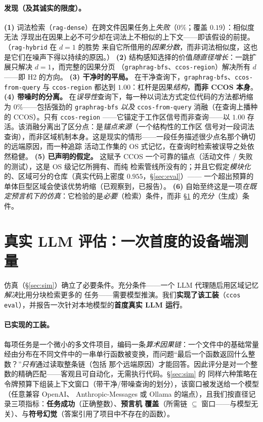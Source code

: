 \documentclass[11pt]{ctexart}
\newcommand{\code}[1]{\texttt{#1}}
\begin{document}
\paragraph{发现（及其诚实的限度）。}
\textbf{(1)} 词法检索（\code{rag-dense}）在跨文件因果任务上\emph{失败}（$0\%$；覆盖 $0.19$）：相似度无法
浮现出在因果上必不可少却在词法上不相似的上下文——即该假设的前提。（\code{rag-hybrid} 在 $d{=}1$ 的胜势
来自它所借用的\emph{因果分数}，而非词法相似度，这也是它们在噪声下得以持续的原因。）
\textbf{(2)} 结构感知选择的价值\emph{随直径增长}：一跳扩展只解决 $d{=}1$，而完整的因果分页
（\code{graphrag-bfs}、\code{ccos-region}）解决所有 $d$——即 H2 的方向。
\textbf{(3) 干净时的平局。} 在干净查询下，\code{graphrag-bfs}、\code{ccos-from-query} 与
\code{ccos-region} 都达到 $1.00$：杠杆是因果\emph{结构}，\textbf{而非 CCOS 本身}。
\textbf{(4) 带噪时的分离。} 在\emph{误导性}查询下，每一种以词法方式定位代码的方法都坍缩为 $0\%$——包括强劲的
\code{graphrag-bfs} \emph{以及} \code{ccos-from-query} 消融（在查询上播种的 CCOS）。只有 \code{ccos-region}
——它锚定于工作区信号而非查询——以 $1.00$ 存活。该消融分离出了区分点：是\emph{锚点来源}（一个结构性的工作区
信号对一段词法查询），而非区域机制本身。这是现实的情形——一段任务描述很少点名那个确切的远端原因，而一种追踪
活动工作集的 OS 式记忆，在查询时检索被误导之处依然稳健。
\textbf{(5) 已声明的假定。} 这赋予 CCOS 一个可靠的锚点（活动文件 / 失败的测试），这是 OS 级记忆所拥有、而纯
检索管线所没有的；并且它假定\emph{模块化}的、区域可分的仓库（真实代码上密度 $0.955$，\S\ref{sec:eval}）——
一个超出预算的单体巨型区域会使该优势坍缩（已观察到，已报告）。
\textbf{(6)} 自始至终这是一项\emph{在既定预言机下的仿真}：它检验的是\emph{必要}（检索）条件，而非
\S\ref{sec:protocol} 的\emph{充分}（生成）条件。

\section{真实 LLM 评估：一次首度的设备端测量}\label{sec:protocol}

仿真（\S\ref{sec:sim}）确立了必要条件。充分条件——一个 LLM 代理随后用区域记忆\emph{解决}比用分块检索更多的
任务——需要模型推演。我们\textbf{实现了该工装}（\code{ccos eval}），并报告一次针对本地模型的\textbf{首度真实
LLM 运行}。

\paragraph{已实现的工装。} 每项任务是一个微小的多文件项目，编码一条\emph{算术因果链}：一个文件中的基础常量
经由分布在不同文件中的一串单行函数被变换，而问题“最后一个函数返回什么整数？”\emph{只有}通过读取整条链（包括
那个远端原因）才能回答。因此评分是对一个整数的精确匹配——客观且可自动化，无需执行代码。\S\ref{sec:sim} 的
同样六种策略在令牌预算下组装上下文窗口（带干净/带噪查询的划分），该窗口被发送给一个模型（任意兼容 OpenAI、
Anthropic-Messages 或 Ollama 的端点），且我们按直径记录三项指标：\textbf{任务成功}（正确整数）、\textbf{预言机
覆盖}（所需链 $\subseteq$ 窗口——与模型无关）、与\textbf{符号幻觉}（答案引用了项目中不存在的函数）。
\end{document}
